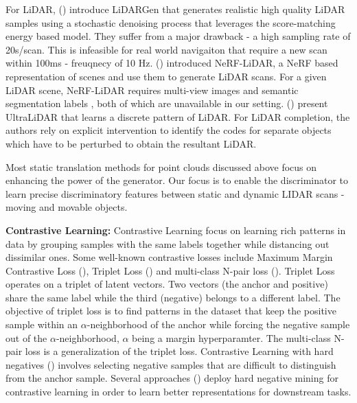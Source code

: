   
  For LiDAR, (\citet{zyrianov2022learning}) introduce LiDARGen that generates realistic high quality LiDAR samples using a stochastic denoising process that leverages the score-matching energy based model. They suffer from a major drawback - a high sampling rate of 20s/scan. This is infeasible for real world navigaiton that require a new scan within 100ms - freuqnecy of 10 Hz. (\citet{zhang2023nerf}) introduced NeRF-LiDAR, a NeRF based representation of scenes and use them to generate LiDAR scans. For a given LiDAR scene, NeRF-LiDAR requires multi-view images and semantic segmentation labels , both of which are unavailable in our setting. (\citet{xiong2023learning}) present UltraLiDAR that learns a discrete pattern of LiDAR. For LiDAR completion, the authors rely on explicit intervention to identify the codes for separate objects which have to be perturbed to obtain the resultant LiDAR.

Most static translation methods for point clouds discussed above focus on enhancing the power of the generator. Our focus is to enable the discriminator to learn precise discriminatory features between static and dynamic LIDAR scans - moving and movable objects.

\textbf{Contrastive Learning:}
Contrastive Learning focus on learning rich patterns in data by grouping samples with the same labels together while distancing out dissimilar ones.
Some well-known contrastive losses include Maximum Margin Contrastive Loss (\citet{hadsell2006dimensionality}), Triplet Loss (\citet{weinberger2009distance}) and multi-class N-pair loss (\citet{sohn2016improved}).
Triplet Loss operates on a triplet of latent vectors. Two vectors (the anchor and positive) share the same label while the third (negative) belongs to a different label. The objective of triplet loss is to find patterns in the dataset that keep the positive sample within an $\alpha$-neighborhood of the anchor while forcing the negative sample out of the $\alpha$-neighborhood, $\alpha$ being a margin hyperparamter.
The multi-class N-pair loss  is a generalization of the triplet loss.
Contrastive Learning with hard negatives (\citet{robinson2020contrastive}) involves selecting negative samples that are difficult to distinguish from the anchor sample. Several approaches (\citet{xie2022delving}) deploy hard negative mining for contrastive learning in order to learn better representations for downstream tasks.